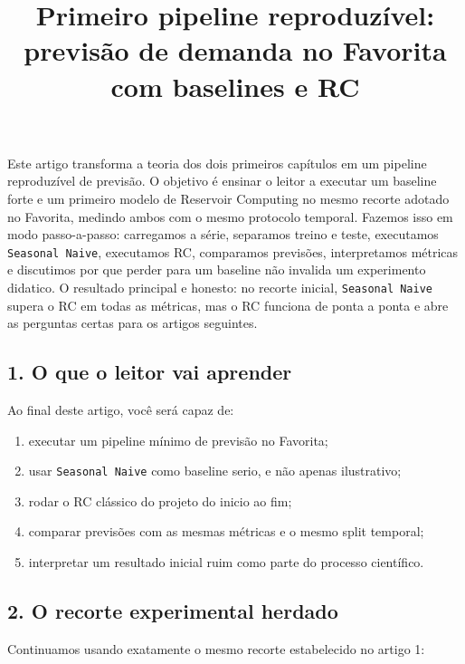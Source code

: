 \documentclass[12pt]{article}
\title{Primeiro pipeline reproduzível: previsão de demanda no Favorita com baselines e RC}
\author{}
\providecommand{\tightlist}{%
          \setlength{\itemsep}{0pt}\setlength{\parskip}{0pt}}
\begin{document}
        \maketitle

        \begin{resumo}
        Este artigo transforma a teoria dos dois primeiros capítulos em um pipeline reproduzível de previsão. O objetivo é ensinar o leitor a executar um baseline forte e um primeiro modelo de Reservoir Computing no mesmo recorte adotado no Favorita, medindo ambos com o mesmo protocolo temporal. Fazemos isso em modo passo-a-passo: carregamos a série, separamos treino e teste, executamos \texttt{Seasonal\ Naive}, executamos RC, comparamos previsões, interpretamos métricas e discutimos por que perder para um baseline não invalida um experimento didatico. O resultado principal e honesto: no recorte inicial, \texttt{Seasonal\ Naive} supera o RC em todas as métricas, mas o RC funciona de ponta a ponta e abre as perguntas certas para os artigos seguintes.
        \end{resumo}

        \subsection{1. O que o leitor vai aprender}\label{1-o-que-o-leitor-vai-aprender}

Ao final deste artigo, você será capaz de:

\begin{enumerate}
\def\labelenumi{\arabic{enumi}.}
\tightlist
\item
  executar um pipeline mínimo de previsão no Favorita;
\item
  usar \texttt{Seasonal\ Naive} como baseline serio, e não apenas ilustrativo;
\item
  rodar o RC clássico do projeto do inicio ao fim;
\item
  comparar previsões com as mesmas métricas e o mesmo split temporal;
\item
  interpretar um resultado inicial ruim como parte do processo científico.
\end{enumerate}

\subsection{2. O recorte experimental herdado}\label{2-o-recorte-experimental-herdado}

Continuamos usando exatamente o mesmo recorte estabelecido no artigo 1:
\end{document}
